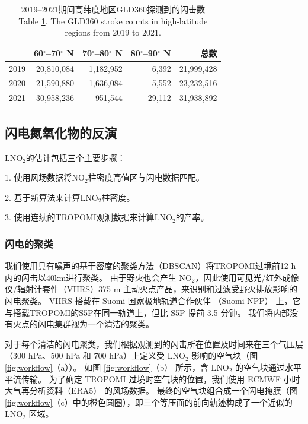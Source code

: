 \begin{table}[htbp]
\centering
\caption{2019--2021期间高纬度地区GLD360探测到的闪击数\\Table \ref{table:arctic_stroke_count}. The GLD360 stroke counts in high-latitude regions from 2019 to 2021.}
\label{table:arctic_stroke_count}
\begin{tabular}{rrrrr}
\hline
{} & 60$^{\circ}$--70$^{\circ}$ N & 70$^{\circ}$--80$^{\circ}$ N & 80$^{\circ}$--90$^{\circ}$ N &       总数 \\
\hline
2019 &                   20,810,084 &                    1,182,952 &                       6,392 &  21,999,428 \\
2020 &                   21,590,880 &                    1,636,084 &                       5,552 &  23,232,516 \\
2021 &                   30,958,236 &                     951,544 &                       29,112 &  31,938,892 \\
\hline
\end{tabular}
\end{table}


\subsection{闪电氮氧化物的反演}

LNO$_2$的估计包括三个主要步骤：

1. 使用风场数据将NO$_2$柱密度高值区与闪电数据匹配。

2. 基于新算法来计算LNO$_2$柱密度。

3. 使用连续的TROPOMI观测数据来计算LNO$_2$的产率。

\subsubsection*{闪电的聚类}

我们使用具有噪声的基于密度的聚类方法（DBSCAN）将TROPOMI过境前12 h内\citep{Allen.2021a}的闪击以40km进行聚类\citep{backlund2011density,Schubert.2017}。
由于野火也会产生 NO$_2$，因此使用可见光/红外成像仪/辐射计套件（VIIRS）375 m 主动火点产品，来识别和过滤受野火排放影响的闪电聚类。
VIIRS 搭载在 Suomi 国家极地轨道合作伙伴 （Suomi-NPP） 上，它与搭载TROPOMI的S5P在同一轨道上，但比 S5P 提前 3.5 分钟。
我们将内部没有火点的闪电集群视为一个清洁的聚类。

对于每个清洁的闪电聚类，我们根据观测到的闪击所在位置及时间来在三个气压层（300 hPa、500 hPa 和 700 hPa）上定义受 LNO$_2$ 影响的空气块（图 \ref{fig:workflow}（a））。
如图 \ref{fig:workflow}（b） 所示，含 LNO$_2$ 的空气块通过水平平流传输。
为了确定 TROPOMI 过境时空气块的位置，我们使用 ECMWF 小时大气再分析资料（ERA5） 的风场数据\citep{Hersbach.2020}。
最终的空气块组合成一个闪电掩膜（图 \ref{fig:workflow}（c）中的橙色圆圈），即三个等压面的前向轨迹构成了一个近似的 LNO$_2$ 区域。


